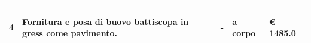\documentclass[a4paper]{article}
\begin{document}
\begin{tabular}{ | L{10mm} |  L{86mm} | L{12mm} | L{12mm} | L{16mm} | }
                                 
                                   \vspace{2.5mm}
                                   \begin{spacing}{0}
                                4
                                   \end{spacing} &
                                   \vspace{2.5mm}
                                   \begin{spacing}{0}
                                Fornitura e posa di buovo battiscopa in gress come pavimento.
                                   \end{spacing} &
                                   \vspace{2.5mm}
                                   \begin{spacing}{0}
                                -
                                   \end{spacing} &
                                   \vspace{2.5mm}
                                   \begin{spacing}{0}
                                a corpo
                                   \end{spacing} &
                                   \vspace{2.5mm}
                                   \begin{spacing}{0}
                                     \euro\hfill 
                                 1485.0
                                   \end{spacing} \\
                                   \hline

                                 \end{tabular} \\
\end{document}
